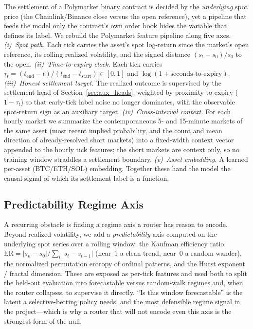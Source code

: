 \documentclass{article}
\begin{document}
The settlement of a Polymarket binary contract is decided by the
\emph{underlying} spot price (the Chainlink/Binance close versus the open
reference), yet a pipeline that feeds the model only the contract's own
order book hides the variable that defines its label.  We rebuild the
Polymarket feature pipeline along five axes.
\emph{(i)~Spot path.}  Each tick carries the asset's spot log-return
since the market's open reference, its rolling realized volatility, and
the signed distance $(s_t - s_0)/s_0$ to the open.
\emph{(ii)~Time-to-expiry clock.}  Each tick carries
$\tau_t = (t_{\text{end}} - t)/(t_{\text{end}} - t_{\text{start}}) \in
[0,1]$ and $\log(1 + \text{seconds-to-expiry})$.
\emph{(iii)~Honest settlement target.}  The realized outcome is
supervised by the settlement head of Section~\ref{sec:aux_heads},
weighted by proximity to expiry ($1 - \tau_t$) so that early-tick label
noise no longer dominates, with the observable spot-return sign as an
auxiliary target.
\emph{(iv)~Cross-interval context.}  For each hourly market we summarize
the contemporaneous 5- and 15-minute markets of the same asset (most
recent implied probability, and the count and mean direction of
already-resolved short markets) into a fixed-width context vector
appended to the hourly tick features; the short markets are context
only, so no training window straddles a settlement boundary.
\emph{(v)~Asset embedding.}  A learned per-asset (BTC/ETH/SOL) embedding.
Together these hand the model the causal signal of which its settlement
label is a function.

\subsection{Predictability Regime Axis}\label{sec:predictability}

A recurring obstacle is finding a regime axis a router has reason to
encode.  Beyond realized volatility, we add a \emph{predictability} axis
computed on the underlying spot series over a rolling window: the Kaufman
efficiency ratio $\mathrm{ER} = |s_n - s_0| / \sum_t |s_t - s_{t-1}|$
(near~1 a clean trend, near~0 a random wander), the normalized
permutation entropy of ordinal patterns, and the Hurst exponent /
fractal dimension.  These are exposed as per-tick features and used both
to split the held-out evaluation into forecastable versus random-walk
regimes and, when the router collapses, to supervise it directly.  ``Is
this window forecastable'' is the latent a selective-betting policy
needs, and the most defensible regime signal in the project---which is
why a router that will not encode even this axis is the strongest form of
the null.
\end{document}
